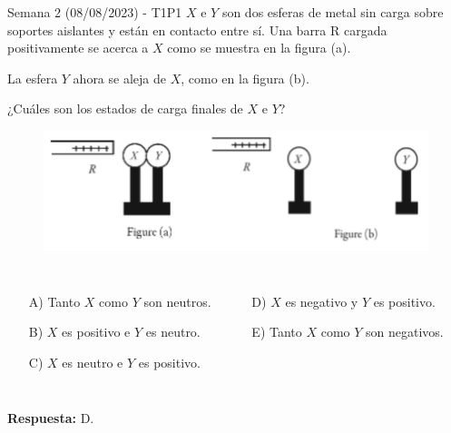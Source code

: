 
\begin{frame}{Semana 2 (08/08/2023) - T1P1}
        $X$ e $Y$ son dos esferas de metal sin carga sobre soportes aislantes y están en contacto entre sí. Una barra R cargada positivamente se acerca a $X$ como se muestra en la figura (a).
        
        La esfera $Y$ ahora se aleja de $X$, como en la figura (b).
        
        ¿Cuáles son los estados de carga finales de $X$ e $Y$?
        
        \begin{figure}
            \centering
            \includegraphics[scale=0.3]{figures/f1.png}
        \end{figure}
        
        \begin{columns}
        \begin{itemize}
            \item[A)] Tanto $X$ como $Y$ son neutros.
            \item[B)] $X$ es positivo e $Y$ es neutro.
            \item[C)] $X$ es neutro e $Y$ es positivo.
            \end{itemize}
        \begin{itemize}
            \item[D)] $X$ es negativo y $Y$ es positivo.
            \item[E)] Tanto $X$ como $Y$ son negativos.
        \end{itemize}
        \end{columns}
        
        
        
        \pause\bigskip\centering \textbf{Respuesta:} D.
\end{frame}

